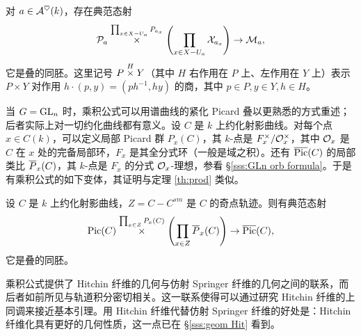 \begin{theorem}\label{th:prod} 对 $a\in\mathcal{A}^{\heartsuit}(k)$，存在典范态射
\begin{equation*}
\mathcal{P}_{a}\stackrel{\prod_{x\in X-U_{a}}P_{a_{x}}}{\times}\left(\prod_{x\in X-U_{a}}\mathcal{X}_{a_{x}}\right)\to \mathcal{M}_{a},
\end{equation*}
它是叠的同胚。这里记号 $P\stackrel{H}{\times}Y$（其中 $H$ 右作用在 $P$ 上、左作用在 $Y$ 上）表示 $P\times Y$ 对作用 $h\cdot (p,y)=(ph^{-1}, hy)$ 的商，其中 $p\in P, y\in Y, h\in H$。
\end{theorem}

当 $G=\textup{GL}_{n}$ 时，乘积公式可以用谱曲线的紧化 Picard 叠以更熟悉的方式重述；后者实际上对一切约化曲线都有意义。设 $C$ 是 $k$ 上约化射影曲线。对每个点 $x\in C(k)$，可以定义局部 Picard 群 $P_{x}(C)$，其 $k$-点是 $F^{\times}_{x}/\mathcal{O}^{\times}_{x}$，其中 $\mathcal{O}_{x}$ 是 $C$ 在 $x$ 处的完备局部环，$F_{x}$ 是其全分式环（一般是域之积）。还有 $\overline{\textup{Pic}}(C)$ 的局部类比 $\overline{P}_{x}(C)$，其 $k$-点是 $F_{x}$ 的分式 $\mathcal{O}_{x}$-理想，参看 \S\ref{sss:GLn orb formula}。于是有乘积公式的如下变体，其证明与定理 \ref{th:prod} 类似。

\begin{prop}\label{p:Pic prod} 设 $C$ 是 $k$ 上约化射影曲线，$Z=C-C^{sm}$ 是 $C$ 的奇点轨迹。则有典范态射
\begin{equation*}
\textup{Pic}(C)\stackrel{\prod_{x\in Z}P_{x}(C)}{\times}\left(\prod_{x\in Z}\overline{P}_{x}(C)\right)\to\overline{\textup{Pic}}(C),
\end{equation*}
它是叠的同胚。
\end{prop}

乘积公式提供了 Hitchin 纤维的几何与仿射 Springer 纤维的几何之间的联系，而后者如前所见与轨道积分密切相关。这一联系使得可以通过研究 Hitchin 纤维的上同调来接近基本引理。用 Hitchin 纤维代替仿射 Springer 纤维的好处是：Hitchin 纤维化具有更好的几何性质，这一点已在 \S\ref{sss:geom Hit} 看到。
